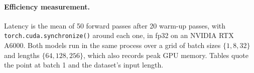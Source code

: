 \paragraph{Efficiency measurement.} Latency is the mean of 50 forward passes
after 20 warm-up passes, with \texttt{torch.cuda.synchronize()} around each
one, in fp32 on an NVIDIA RTX A6000. Both models run in the same process over
a grid of batch sizes $\{1, 8, 32\}$ and lengths $\{64, 128, 256\}$, which
also records peak GPU memory. Tables quote the point at batch 1
and the dataset's input length.
